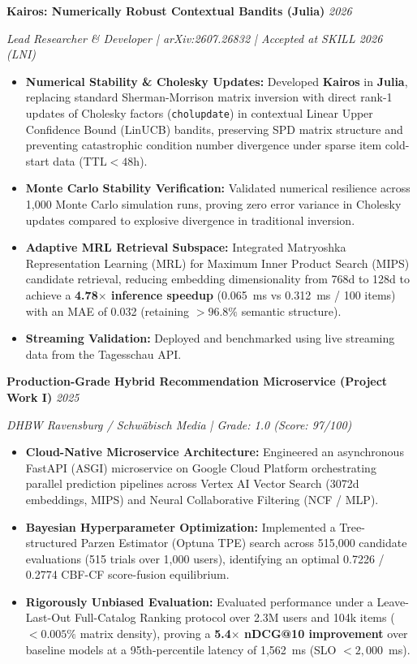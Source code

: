 \documentclass[10pt, a4paper]{article}
\newcommand{\cvitem}[2]{
  \vspace{1.5pt}
  \noindent\textbf{#1} \hfill \textit{#2} \par
  \vspace{-1pt}
}
\begin{document}
\cvitem{Kairos: Numerically Robust Contextual Bandits (Julia)}{2026}
\textit{Lead Researcher \& Developer | arXiv:2607.26832 | Accepted at SKILL 2026 (LNI)}
\vspace{-4pt}
\begin{itemize}[leftmargin=0.15in, label=\textbullet, itemsep=1.5pt, topsep=1.5pt]
  \item \textbf{Numerical Stability \& Cholesky Updates:} Developed \textbf{Kairos} in \textbf{Julia}, replacing standard Sherman-Morrison matrix inversion with direct rank-1 updates of Cholesky factors (\texttt{cholupdate}) in contextual Linear Upper Confidence Bound (LinUCB) bandits, preserving SPD matrix structure and preventing catastrophic condition number divergence under sparse item cold-start data ($\text{TTL} < 48\text{h}$).
  \item \textbf{Monte Carlo Stability Verification:} Validated numerical resilience across 1,000 Monte Carlo simulation runs, proving zero error variance in Cholesky updates compared to explosive divergence in traditional inversion.
  \item \textbf{Adaptive MRL Retrieval Subspace:} Integrated Matryoshka Representation Learning (MRL) for Maximum Inner Product Search (MIPS) candidate retrieval, reducing embedding dimensionality from 768d to 128d to achieve a \textbf{4.78$\times$ inference speedup} (0.065~ms vs 0.312~ms / 100 items) with an MAE of 0.032 (retaining $>96.8\%$ semantic structure).
  \item \textbf{Streaming Validation:} Deployed and benchmarked using live streaming data from the Tagesschau API.
\end{itemize}

\vspace{2pt}
\cvitem{Production-Grade Hybrid Recommendation Microservice (Project Work I)}{2025}
\textit{DHBW Ravensburg / Schw{\"a}bisch Media | Grade: 1.0 (Score: 97/100)}
\vspace{-4pt}
\begin{itemize}[leftmargin=0.15in, label=\textbullet, itemsep=1.5pt, topsep=1.5pt]
  \item \textbf{Cloud-Native Microservice Architecture:} Engineered an asynchronous FastAPI (ASGI) microservice on Google Cloud Platform orchestrating parallel prediction pipelines across Vertex AI Vector Search (3072d embeddings, MIPS) and Neural Collaborative Filtering (NCF / MLP).
  \item \textbf{Bayesian Hyperparameter Optimization:} Implemented a Tree-structured Parzen Estimator (Optuna TPE) search across 515,000 candidate evaluations (515 trials over 1,000 users), identifying an optimal 0.7226 / 0.2774 CBF-CF score-fusion equilibrium.
  \item \textbf{Rigorously Unbiased Evaluation:} Evaluated performance under a Leave-Last-Out Full-Catalog Ranking protocol over 2.3M users and 104k items ($<0.005\%$ matrix density), proving a \textbf{5.4$\times$ nDCG@10 improvement} over baseline models at a 95th-percentile latency of 1,562~ms (SLO $< 2,000$~ms).
\end{itemize}
\end{document}
